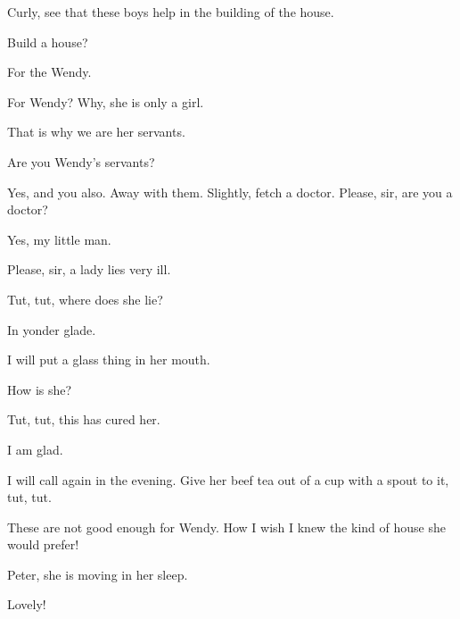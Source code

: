 \begin{drama}
Curly, see that these boys help in the building of the house.

\johnspeaks
Build a house?

\curlyspeaks
For the Wendy.

For Wendy?
Why, she is only a girl.

\curlyspeaks
That is why we are her servants.

Are you Wendy's servants?

\peterspeaks
Yes, and you also.
Away with them.
Slightly, fetch a doctor.
Please, sir, are you a doctor?

Yes, my little man.

\peterspeaks
Please, sir, a lady lies very ill.

Tut, tut, where does she lie?

\peterspeaks
In yonder glade.

\slightlyspeaks
I will put a glass thing in her mouth.

How is she?

\slightlyspeaks
Tut, tut, this has cured her.

I am glad.

\slightlyspeaks
I will call again in the evening.
Give her beef tea out of a cup with a spout to it, tut, tut.


These are not good enough for Wendy.
How I wish I knew the kind of house she would prefer!

\firsttwinspeaks
Peter, she is moving in her sleep.

Lovely!


\end{drama}
